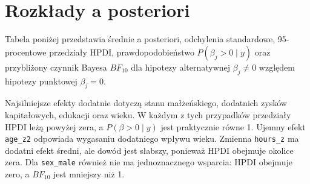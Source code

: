 \documentclass[12pt,a4paper]{article}
\begin{document}
\section{Rozkłady a posteriori}

Tabela poniżej przedstawia średnie a posteriori, odchylenia standardowe,
95-procentowe przedziały HPDI, prawdopodobieństwo \(P(\beta_j>0\mid y)\) oraz
przybliżony czynnik Bayesa \(BF_{10}\) dla hipotezy alternatywnej
\(\beta_j \neq 0\) względem hipotezy punktowej \(\beta_j=0\).

\begin{table}[H]
\centering
\caption{Podsumowanie rozkładów a posteriori parametrów modelu}
\scriptsize
{}
\end{table}

Najsilniejsze efekty dodatnie dotyczą stanu małżeńskiego, dodatnich zysków
kapitałowych, edukacji oraz wieku. W każdym z tych przypadków przedziały HPDI
leżą powyżej zera, a
\(P(\beta>0\mid y)\) jest praktycznie równe 1. Ujemny efekt
\texttt{age\_z2} odpowiada wygasaniu dodatniego wpływu wieku. Zmienna
\texttt{hours\_z} ma dodatni efekt średni, ale dowód jest słabszy, ponieważ HPDI
obejmuje okolice zera. Dla \texttt{sex\_male} również nie ma jednoznacznego
wsparcia: HPDI obejmuje zero, a \(BF_{10}\) jest mniejszy niż 1.
\end{document}
